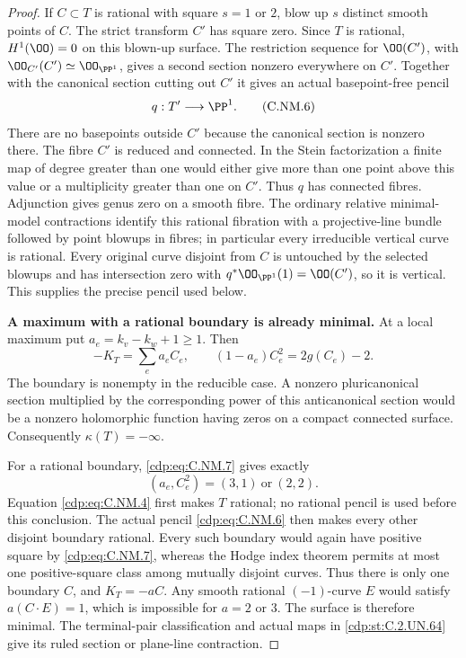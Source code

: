 \begin{proof}
If $C\subset T$ is rational with square $s=1$ or $2$,
blow up $s$ distinct smooth points of $C$. The strict
transform $C'$ has square zero. Since $T$ is rational,
$H^1(\OO)=0$ on this blown-up surface. The restriction
sequence for $\OO(C')$, with
$\OO_{C'}(C')\simeq\OO_{\PP^1}$, gives a second section
nonzero everywhere on $C'$. Together with the canonical
section cutting out $C'$ it gives an actual basepoint-free
pencil
\[
                         q:T'\longrightarrow\PP^1.
\tag{C.NM.6}\label{cdp:eq:C.NM.6}
\]
There are no basepoints outside $C'$ because the canonical
section is nonzero there. The fibre $C'$ is reduced and
connected. In the Stein factorization a finite map of
degree greater than one would either give more than one
point above this value or a multiplicity greater than one
on $C'$. Thus $q$ has connected fibres. Adjunction gives
genus zero on a smooth fibre. The ordinary relative
minimal-model contractions identify this rational fibration
with a projective-line bundle followed by point blowups
in fibres; in particular every irreducible vertical curve
is rational. Every original curve disjoint from $C$
is untouched by the selected blowups and has intersection
zero with $q^*\OO_{\PP^1}(1)=\OO(C')$, so it is vertical.
This supplies the precise pencil used below.

\par\medskip\noindent\textbf{A maximum with a rational boundary is already minimal.}
At a local maximum put $a_e=k_v-k_w+1\ge1$. Then
\[
             -K_T=\sum_e a_eC_e,\qquad
             (1-a_e)C_e^2=2g(C_e)-2.
\tag{C.NM.7}\label{cdp:eq:C.NM.7}
\]
The boundary is nonempty in the reducible case. A nonzero
pluricanonical section multiplied by the corresponding
power of this anticanonical section would be a nonzero
holomorphic function having zeros on a compact connected
surface. Consequently $\kappa(T)=-\infty$.

For a rational boundary, \eqref{cdp:eq:C.NM.7} gives exactly
\[
                     (a_e,C_e^2)=(3,1)\ \text{or}\ (2,2).
\tag{C.NM.8}\label{cdp:eq:C.NM.8}
\]
Equation \eqref{cdp:eq:C.NM.4} first makes $T$ rational; no rational
pencil is used before this conclusion. The actual pencil
\eqref{cdp:eq:C.NM.6} then makes every other disjoint boundary rational.
Every such boundary would again have positive square by
\eqref{cdp:eq:C.NM.7}, whereas the Hodge index theorem permits at most
one positive-square class among mutually disjoint curves.
Thus there is only one boundary $C$, and $K_T=-aC$.
Any smooth rational $(-1)$-curve $E$ would satisfy
$a(C\cdot E)=1$, which is impossible for $a=2$ or $3$.
The surface is therefore minimal. The terminal-pair
classification and actual maps in \ref{cdp:st:C.2.UN.64} give its ruled
section or plane-line contraction.


\end{proof}
